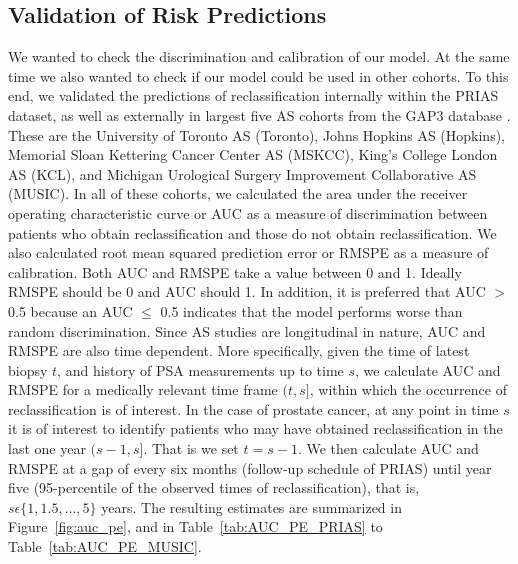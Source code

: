 \subsection{Validation of Risk Predictions}
We wanted to check the discrimination and calibration of our model. At the same time we also wanted to check if our model could be used in other cohorts. To this end, we validated the predictions of reclassification internally within the PRIAS dataset, as well as externally in largest five AS cohorts from the GAP3 database \citep{gap3_2018}. These are the University of Toronto AS (Toronto), Johns Hopkins AS (Hopkins), Memorial Sloan Kettering Cancer Center AS (MSKCC), King's College London AS (KCL), and Michigan Urological Surgery Improvement Collaborative AS (MUSIC). In all of these cohorts, we calculated the area under the receiver operating characteristic curve or AUC \cite{rizopoulos2017dynamic} as a measure of discrimination between patients who obtain reclassification and those do not obtain reclassification. We also calculated root mean squared prediction error or RMSPE \cite{rizopoulos2017dynamic} as a measure of calibration. Both AUC and RMSPE take a value between 0 and 1. Ideally RMSPE should be 0 and AUC should 1. In addition, it is preferred that AUC $>$ 0.5 because an AUC $\leq$ 0.5 indicates that the model performs worse than random discrimination. Since AS studies are longitudinal in nature, AUC and RMSPE are also time dependent. More specifically, given the time of latest biopsy $t$, and history of PSA measurements up to time $s$, we calculate AUC and RMSPE for a medically relevant time frame $(t, s]$, within which the occurrence of reclassification is of interest. In the case of prostate cancer, at any point in time $s$ it is of interest to identify patients who may have obtained reclassification in the last one year $(s-1, s]$. That is we set $t=s-1$. We then calculate AUC and RMSPE at a gap of every six months (follow-up schedule of PRIAS) until year five (95-percentile of the observed times of reclassification), that is, $s \epsilon \{1, 1.5, \ldots, 5\}$ years. The resulting estimates are summarized in Figure~\ref{fig:auc_pe}, and in Table~\ref{tab:AUC_PE_PRIAS} to Table~\ref{tab:AUC_PE_MUSIC}.

